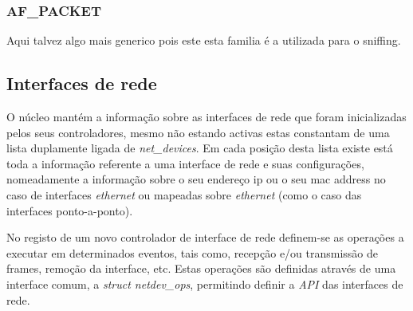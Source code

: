 \subsubsection{AF\_PACKET}

Aqui talvez algo mais generico pois este esta familia é a utilizada para o sniffing.

% 
%						
%
% 

\subsection{Interfaces de rede}

O núcleo mantém a informação sobre as interfaces de rede que foram inicializadas pelos seus controladores, mesmo não estando activas estas constantam de uma lista duplamente ligada de \textit{net\_devices}. 
 Em cada posição desta lista existe está toda a informação referente a uma interface de rede e suas configurações, nomeadamente a informação sobre o seu endereço ip ou o seu mac address no caso de interfaces \textit{ethernet} ou mapeadas sobre \textit{ethernet} (como o caso das interfaces ponto-a-ponto).

No registo de um novo controlador de interface de rede definem-se as operações a executar em determinados eventos, tais como, recepção e/ou transmissão de frames, remoção da interface, etc.
 Estas operações são definidas através de uma interface comum, a \textit{struct netdev\_ops}, permitindo definir a \textit{API} das interfaces de rede.

